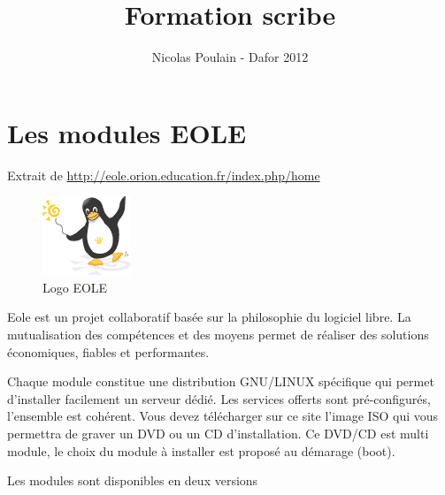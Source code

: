 \documentclass{article}
\title{Formation scribe}
\author{Nicolas Poulain - Dafor 2012}
\makeatletter
\def\maxwidth{\ifdim\Gin@nat@width>\linewidth\linewidth
\else\Gin@nat@width\fi}
\let\Oldincludegraphics\includegraphics
\renewcommand{\includegraphics}[1]{\Oldincludegraphics[width=\maxwidth]{#1}}
\makeatother
\begin{document}
\maketitle

\tableofcontents

\section{Les modules EOLE}

Extrait de
\href{http://eole.orion.education.fr/index.php/home}{http}\href{http://eole.orion.education.fr/index.php/home}{://}\href{http://eole.orion.education.fr/index.php/home}{eole}\href{http://eole.orion.education.fr/index.php/home}{.}\href{http://eole.orion.education.fr/index.php/home}{orion}\href{http://eole.orion.education.fr/index.php/home}{.}\href{http://eole.orion.education.fr/index.php/home}{education}\href{http://eole.orion.education.fr/index.php/home}{.}\href{http://eole.orion.education.fr/index.php/home}{fr}\href{http://eole.orion.education.fr/index.php/home}{/}\href{http://eole.orion.education.fr/index.php/home}{index}\href{http://eole.orion.education.fr/index.php/home}{.}\href{http://eole.orion.education.fr/index.php/home}{php}\href{http://eole.orion.education.fr/index.php/home}{/}\href{http://eole.orion.education.fr/index.php/home}{home}

\begin{figure}[htbp]
\centering
\includegraphics{scribe_html_2ce1ff75.png}
\caption{Logo EOLE}
\end{figure}

Eole est un projet collaboratif basée sur la philosophie du logiciel
libre. La mutualisation des compétences et des moyens permet de réaliser
des solutions économiques, fiables et performantes.

Chaque module constitue une distribution GNU/LINUX spécifique qui permet
d'installer facilement un serveur dédié. Les services offerts sont
pré-configurés, l'ensemble est cohérent. Vous devez télécharger sur ce
site l'image ISO qui vous permettra de graver un DVD ou un CD
d'installation. Ce DVD/CD est multi module, le choix du module à
installer est proposé au démarage (boot).

Les modules sont disponibles en deux versions
\end{document}

